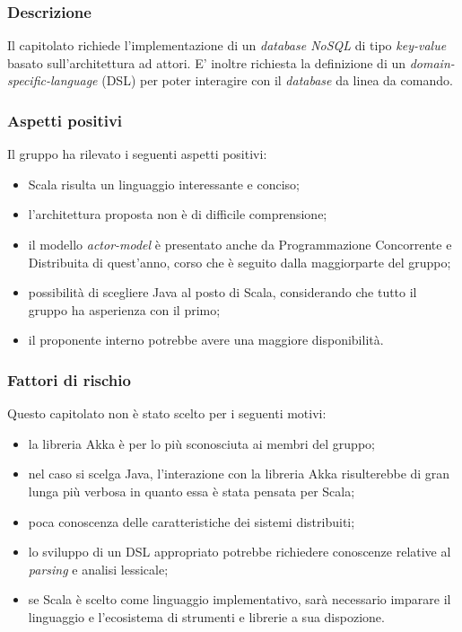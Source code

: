 \documentclass[12pt,a4paper]{article}
\begin{document}
\subsubsection{Descrizione}

Il capitolato richiede l'implementazione di un \textit{database NoSQL} di tipo \textit{key-value} basato
sull'architettura ad attori. E' inoltre richiesta la definizione di un \textit{domain-specific-language} (DSL)
per poter interagire con il \textit{database} da linea da comando.

\subsubsection{Aspetti positivi}

Il gruppo ha rilevato i seguenti aspetti positivi:

\begin{itemize}
\item Scala risulta un linguaggio interessante e conciso;
\item l'architettura proposta non è di difficile comprensione;
\item il modello \textit{actor-model} è presentato anche da Programmazione Concorrente e Distribuita di quest'anno, corso che è seguito dalla maggiorparte del gruppo;
\item possibilità di scegliere Java al posto di Scala, considerando che tutto il gruppo ha asperienza con il primo;
\item il proponente interno potrebbe avere una maggiore disponibilità.
\end{itemize}

\subsubsection{Fattori di rischio}

Questo capitolato non è stato scelto per i seguenti motivi:

\begin{itemize}
\item la libreria Akka è per lo più sconosciuta ai membri del gruppo;
\item nel caso si scelga Java, l'interazione con la libreria Akka risulterebbe di gran lunga più verbosa
in quanto essa è stata pensata per Scala;
\item poca conoscenza delle caratteristiche dei sistemi distribuiti;
\item lo sviluppo di un DSL appropriato potrebbe richiedere conoscenze relative al \textit{parsing} e 
analisi lessicale;
\item se Scala è scelto come linguaggio implementativo, sarà necessario imparare il linguaggio e l'ecosistema
di strumenti e librerie a sua dispozione.
\end{itemize}
\end{document}
